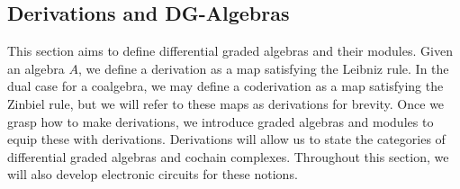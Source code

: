 \documentclass[../thesis.tex]{subfiles}
\begin{document}
    \subsection{Derivations and DG-Algebras}
            This section aims to define differential graded algebras and their modules. Given an algebra $A$, we define a derivation as a map satisfying the Leibniz rule. In the dual case for a coalgebra, we may define a coderivation as a map satisfying the Zinbiel rule, but we will refer to these maps as derivations for brevity. Once we grasp how to make derivations, we introduce graded algebras and modules to equip these with derivations. Derivations will allow us to state the categories of differential graded algebras and cochain complexes. Throughout this section, we will also develop electronic circuits for these notions.
\end{document}
